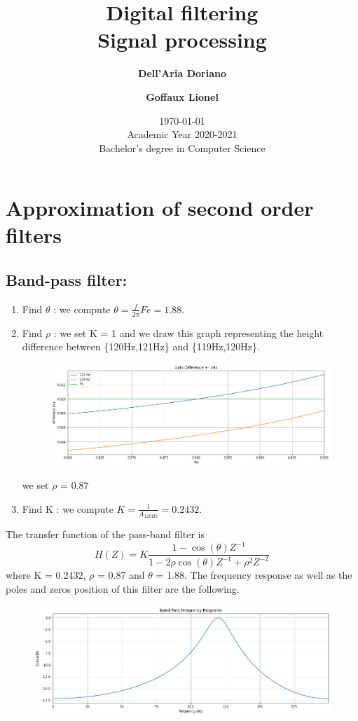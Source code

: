 \documentclass[]{article}
\title{
{\Huge Digital filtering}\\
Signal processing\\
}
\author{
\textbf{Dell’Aria Doriano}\\
\and
\textbf{Goffaux Lionel}
}
\date{\today\\
Academic Year 2020-2021\\
Bachelor's degree in Computer Science}
\begin{document}
\maketitle

\section{Approximation of second order filters}
\subsection*{Band-pass filter:}
\begin{enumerate}
    \item Find $\theta$ : we compute $\theta = \frac{f}{2\pi}Fe = 1.88$.
    \item Find $\rho$ : we set K = 1 and we draw this graph representing the height difference between \{120Hz,121Hz\} and \{119Hz,120Hz\}.
    \begin{figure}[H]
        \centering
        \includegraphics[scale=0.5]{q11.png}
    \end{figure}
    we set $\rho$ = 0.87
    \item Find K : we compute $K = \frac{1}{A_{120Hz}}=0.2432$.
\end{enumerate}
The transfer function of the pass-band filter is 
$$H(Z) = K\frac{1 - \cos{(\theta)} Z^{-1}}{1 - 2\rho \cos{(\theta)Z^{-1} +\rho^2Z^{-2}}}$$
where K = 0.2432, $\rho$ = 0.87 and $\theta$ = 1.88. The frequency response as well as the poles and zeros position of this filter are the following.

\begin{figure}[H]
    \centering
    \includegraphics[scale=0.5]{q12.png}
\end{figure}
\end{document}
